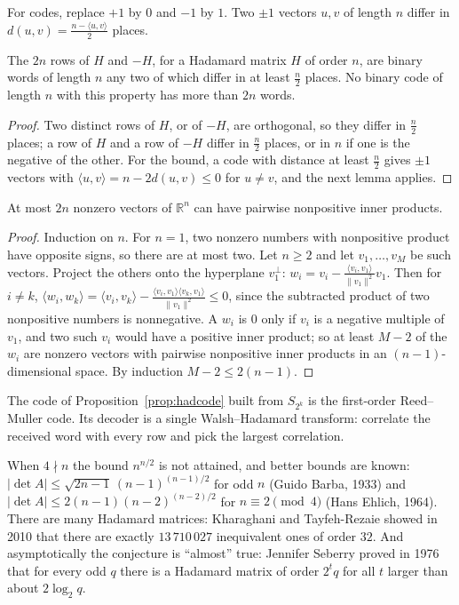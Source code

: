 For codes, replace $+1$ by $0$ and $-1$ by $1$. Two $\pm1$ vectors $u,v$ of length $n$ differ in $d(u,v)=\frac{n-\langle u,v\rangle}2$ places.

\begin{proposition}\label{prop:hadcode}
The $2n$ rows of $H$ and $-H$, for a Hadamard matrix $H$ of order $n$, are binary words of length $n$ any two of which differ in at least $\frac n2$
places. No binary code of length $n$ with this property has more than $2n$ words.
\end{proposition}
\begin{proof}
Two distinct rows of $H$, or of $-H$, are orthogonal, so they differ in $\frac n2$ places; a row of $H$ and a row of $-H$ differ in $\frac n2$ places, or in
$n$ if one is the negative of the other. For the bound, a code with distance at least $\frac n2$ gives $\pm1$ vectors with
$\langle u,v\rangle=n-2d(u,v)\le0$ for $u\neq v$, and the next lemma applies.
\end{proof}

\begin{lemma}\label{lem:obtuse}
At most $2n$ nonzero vectors of $\mathbb R^n$ can have pairwise nonpositive inner products.
\end{lemma}
\begin{proof}
Induction on $n$. For $n=1$, two nonzero numbers with nonpositive product have opposite signs, so there are at most two. Let $n\ge2$ and let
$v_1,\dots,v_M$ be such vectors. Project the others onto the hyperplane $v_1^\perp$: $w_i=v_i-\frac{\langle v_i,v_1\rangle}{\|v_1\|^2}v_1$. Then for
$i\neq k$, $\langle w_i,w_k\rangle=\langle v_i,v_k\rangle-\frac{\langle v_i,v_1\rangle\langle v_k,v_1\rangle}{\|v_1\|^2}\le0$, since the subtracted
product of two nonpositive numbers is nonnegative. A $w_i$ is $0$ only if $v_i$ is a negative multiple of $v_1$, and two such $v_i$ would have a positive
inner product; so at least $M-2$ of the $w_i$ are nonzero vectors with pairwise nonpositive inner products in an $(n-1)$-dimensional space. By
induction $M-2\le2(n-1)$.
\end{proof}

The code of Proposition~\ref{prop:hadcode} built from $S_{2^k}$ is the first-order Reed--Muller code. Its decoder is a single Walsh--Hadamard
transform: correlate the received word with every row and pick the largest correlation.

\begin{remark}\label{rem:barba}
When $4\nmid n$ the bound $n^{n/2}$ is not attained, and better bounds are known: $|\det A|\le\sqrt{2n-1}\,(n-1)^{(n-1)/2}$ for odd $n$ (Guido Barba,
1933) and $|\det A|\le2(n-1)(n-2)^{(n-2)/2}$ for $n\equiv2\pmod4$ (Hans Ehlich, 1964). There are many Hadamard matrices: Kharaghani and Tayfeh-Rezaie
showed in 2010 that there are exactly $13\,710\,027$ inequivalent ones of order $32$. And asymptotically the conjecture is ``almost'' true: Jennifer
Seberry proved in 1976 that for every odd $q$ there is a Hadamard matrix of order $2^tq$ for all $t$ larger than about $2\log_2q$.
\end{remark}

